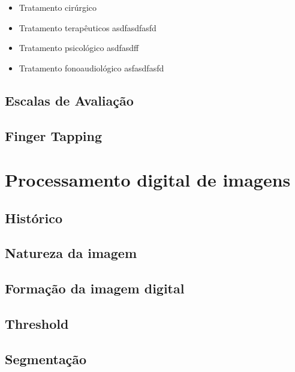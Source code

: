 \documentclass[
	12pt,				%
	openany,			%
	oneside,			%
	a4paper,			%
	english,			%
	french,				%
	spanish,			%
	brazil				%
	]{abntex2}
\begin{document}
\begin{itemize}
	\item Tratamento cirúrgico
	
	
	
	
\end{itemize}
\begin{itemize}
	\item Tratamento terapêuticos
	asdfasdfasfd
\end{itemize}
\begin{itemize}
	\item Tratamento psicológico
	asdfasdff
\end{itemize}
\begin{itemize}
	\item Tratamento fonoaudiológico
	asfasdfasfd
\end{itemize}


\subsection{Escalas de Avaliação}

\subsection{Finger Tapping}


\section{Processamento digital de imagens}
	
	\subsection{Histórico}
	\subsection{Natureza da imagem}
	\subsection{Formação da imagem digital}
	\subsection{Threshold}	
	\subsection{Segmentação}
\end{document}
